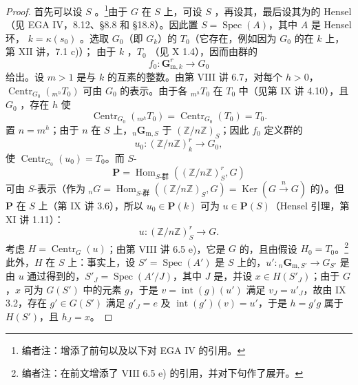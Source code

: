 \begin{proof}
首先可以设 $S$ 。\footnote[43]{编者注：增添了前句以及以下对 EGA IV 的引用。}由于 $G$ 在 $S$ 上，可设 $S$ ，再设其，最后设其为的 Hensel （见 EGA IV，8.12、\S 8.8 和 \S 18.8）。因此置 $S=\operatorname{Spec}(A)$，其中 $A$ 是 Hensel 环， $k=\kappa(s_0)$ 。选取 $G_0$（即 $G_k$）的 $T_0$（它存在，例如因为 $G_0$ 的在 $k$ 上，第 XII 讲，7.1 c)）；
由于 $k$ ，$T_0$ （见 X 1.4），因而由群的
\[
f_0:\mathbf G_{\mathrm m,k}^r\longrightarrow G_0
\]
给出。设 $m>1$ 是与 $k$ 的互素的整数。由第 VIII 讲 6.7，对每个 $h>0$，$\operatorname{Centr}_{G_0}({}_{m^h}T_0)$ 可由 $G_0$ 的表示。由于各 ${}_{m^h}T_0$ 在 $T_0$ 中（见第 IX 讲 4.10），且 $G_0$ ，存在 $h$ 使
\[
\operatorname{Centr}_{G_0}({}_{m^h}T_0)=\operatorname{Centr}_{G_0}(T_0)=T_0.
\]
置 $n=m^h$；由于 $n$ 在 $S$ 上，${}_n\mathbf G_{\mathrm m,S}$ 于 $(\mathbb Z/n\mathbb Z)_S$；因此 $f_0$ 定义群的
\[
u_0:(\mathbb Z/n\mathbb Z)_k^r\longrightarrow G_0,
\]
使 $\operatorname{Centr}_{G_0}(u_0)=T_0$。而 $S$-
\[
\mathbf P=\operatorname{Hom}_{S\text{-群}}((\mathbb Z/n\mathbb Z)_S^r,G)
\]
可由 $S$-表示（作为 ${}_nG=\operatorname{Hom}_{S\text{-群}}((\mathbb Z/n\mathbb Z)_S,G)=\operatorname{Ker}(G\xrightarrow{n}G)$ 的）。但 $\mathbf P$ 在 $S$ 上（第 IX 讲 3.6），所以 $u_0\in\mathbf P(k)$ 可为 $u\in\mathbf P(S)$（Hensel 引理，第 XI 讲 1.11）：
\[
u:(\mathbb Z/n\mathbb Z)_S^r\longrightarrow G.
\]
考虑 $H=\operatorname{Centr}_G(u)$；由第 VIII 讲 6.5 e)，它是 $G$ 的，且由假设 $H_0=T_0$。\footnote[44]{编者注：在前文增添了 VIII 6.5 e) 的引用，并对下句作了展开。}此外，$H$ 在 $S$ 上：事实上，设 $S'=\operatorname{Spec}(A')$ 是 $S$ 上的，$u':{}_n\mathbf G_{\mathrm m,S'}\to G_{S'}$ 是由 $u$ 通过得到的，$S'_J=\operatorname{Spec}(A'/J)$，其中 $J$ 是，并设 $x\in H(S'_J)$；由于 $G$ ，$x$ 可为 $G(S')$ 中的元素 $g$，于是 $v=\operatorname{int}(g)(u')$ 满足 $v_J=u'_J$，故由 IX 3.2，存在 $g'\in G(S')$ 满足 $g'_J=e$ 及 $\operatorname{int}(g')(v)=u'$，于是 $h=g'g$ 属于 $H(S')$，且 $h_J=x$。


\end{proof}

